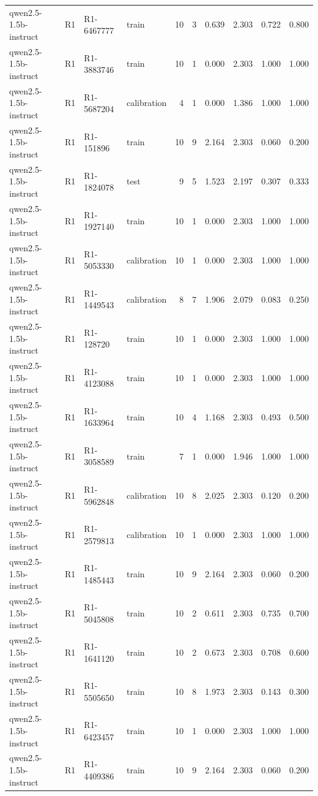 \begin{table}
\begin{tabular}{llllrrrrrr}
qwen2.5-1.5b-instruct & R1 & R1-6467777 & train & 10 & 3 & 0.639 & 2.303 & 0.722 & 0.800 \\
qwen2.5-1.5b-instruct & R1 & R1-3883746 & train & 10 & 1 & 0.000 & 2.303 & 1.000 & 1.000 \\
qwen2.5-1.5b-instruct & R1 & R1-5687204 & calibration & 4 & 1 & 0.000 & 1.386 & 1.000 & 1.000 \\
qwen2.5-1.5b-instruct & R1 & R1-151896 & train & 10 & 9 & 2.164 & 2.303 & 0.060 & 0.200 \\
qwen2.5-1.5b-instruct & R1 & R1-1824078 & test & 9 & 5 & 1.523 & 2.197 & 0.307 & 0.333 \\
qwen2.5-1.5b-instruct & R1 & R1-1927140 & train & 10 & 1 & 0.000 & 2.303 & 1.000 & 1.000 \\
qwen2.5-1.5b-instruct & R1 & R1-5053330 & calibration & 10 & 1 & 0.000 & 2.303 & 1.000 & 1.000 \\
qwen2.5-1.5b-instruct & R1 & R1-1449543 & calibration & 8 & 7 & 1.906 & 2.079 & 0.083 & 0.250 \\
qwen2.5-1.5b-instruct & R1 & R1-128720 & train & 10 & 1 & 0.000 & 2.303 & 1.000 & 1.000 \\
qwen2.5-1.5b-instruct & R1 & R1-4123088 & train & 10 & 1 & 0.000 & 2.303 & 1.000 & 1.000 \\
qwen2.5-1.5b-instruct & R1 & R1-1633964 & train & 10 & 4 & 1.168 & 2.303 & 0.493 & 0.500 \\
qwen2.5-1.5b-instruct & R1 & R1-3058589 & train & 7 & 1 & 0.000 & 1.946 & 1.000 & 1.000 \\
qwen2.5-1.5b-instruct & R1 & R1-5962848 & calibration & 10 & 8 & 2.025 & 2.303 & 0.120 & 0.200 \\
qwen2.5-1.5b-instruct & R1 & R1-2579813 & calibration & 10 & 1 & 0.000 & 2.303 & 1.000 & 1.000 \\
qwen2.5-1.5b-instruct & R1 & R1-1485443 & train & 10 & 9 & 2.164 & 2.303 & 0.060 & 0.200 \\
qwen2.5-1.5b-instruct & R1 & R1-5045808 & train & 10 & 2 & 0.611 & 2.303 & 0.735 & 0.700 \\
qwen2.5-1.5b-instruct & R1 & R1-1641120 & train & 10 & 2 & 0.673 & 2.303 & 0.708 & 0.600 \\
qwen2.5-1.5b-instruct & R1 & R1-5505650 & train & 10 & 8 & 1.973 & 2.303 & 0.143 & 0.300 \\
qwen2.5-1.5b-instruct & R1 & R1-6423457 & train & 10 & 1 & 0.000 & 2.303 & 1.000 & 1.000 \\
qwen2.5-1.5b-instruct & R1 & R1-4409386 & train & 10 & 9 & 2.164 & 2.303 & 0.060 & 0.200 \\

\end{tabular}
\end{table}
